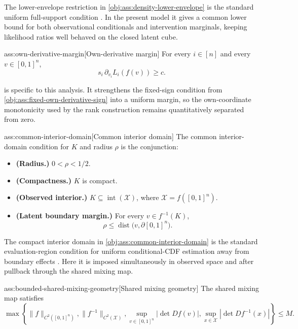 The lower-envelope restriction in \cref{obj:ass:density-lower-envelope} is the standard uniform full-support condition \citep{Xie2023UniformConditionalCDF}. In the present model it gives a common lower bound for both observational conditionals and intervention marginals, keeping likelihood ratios well behaved on the closed latent cube.

\begin{assumptionv}{ass:own-derivative-margin}[Own-derivative margin]
For every \(i\in[n]\) and every \(v\in[0,1]^n\),
\[
s_i\,\partial_{v_i}L_i(f(v))\ge c.
\]
\end{assumptionv}

 is specific to this analysis. It strengthens the fixed-sign condition from \cref{obj:ass:fixed-own-derivative-sign} into a uniform margin, so the own-coordinate monotonicity used by the rank construction remains quantitatively separated from zero.

\begin{assumptionv}{ass:common-interior-domain}[Common interior domain]
The common interior-domain condition for \(K\) and radius \(\rho\) is the conjunction:
\begin{itemize}
\item \textbf{(Radius.)} \(0<\rho<1/2\).
\item \textbf{(Compactness.)} \(K\) is compact.
\item \textbf{(Observed interior.)} \(K\subseteq \operatorname{int}(\mathcal X)\), where \(\mathcal X=f([0,1]^n)\).
\item \textbf{(Latent boundary margin.)} For every \(v\in f^{-1}(K)\),
\[
\rho\le \operatorname{dist}\bigl(v,\partial[0,1]^n\bigr).
\]
\end{itemize}
\end{assumptionv}

The compact interior domain in \cref{obj:ass:common-interior-domain} is the standard evaluation-region condition for uniform conditional-CDF estimation away from boundary effects \citep{Xie2023UniformConditionalCDF}. Here it is imposed simultaneously in observed space and after pullback through the shared mixing map.

\begin{assumptionv}{ass:bounded-shared-mixing-geometry}[Shared mixing geometry]
The shared mixing map satisfies
\[
\max\left\{
\|f\|_{C^2([0,1]^n)},
\|f^{-1}\|_{C^2(\mathcal X)},
\sup_{v\in[0,1]^n}|\det Df(v)|,
\sup_{x\in\mathcal X}|\det Df^{-1}(x)|
\right\}\le M.
\]
\end{assumptionv}

